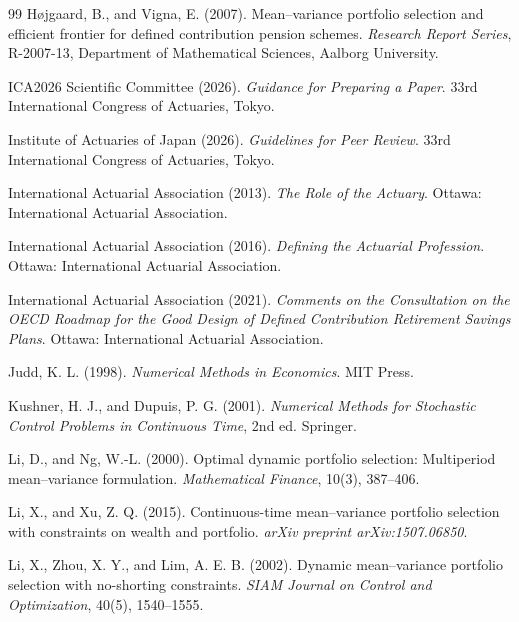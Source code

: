 \documentclass[10pt,a4paper]{article}
\theoremstyle{plain}
\theoremstyle{definition}
\begin{document}
\begin{thebibliography}{99}
H{\o}jgaard, B., and Vigna, E. (2007).
Mean--variance portfolio selection and efficient frontier for defined contribution pension schemes.
\emph{Research Report Series}, R-2007-13, Department of Mathematical Sciences, Aalborg University.

ICA2026 Scientific Committee (2026).
\emph{Guidance for Preparing a Paper}.
33rd International Congress of Actuaries, Tokyo.

Institute of Actuaries of Japan (2026).
\emph{Guidelines for Peer Review}.
33rd International Congress of Actuaries, Tokyo.

International Actuarial Association (2013).
\emph{The Role of the Actuary}.
Ottawa: International Actuarial Association.

International Actuarial Association (2016).
\emph{Defining the Actuarial Profession}.
Ottawa: International Actuarial Association.

International Actuarial Association (2021).
\emph{Comments on the Consultation on the OECD Roadmap for the Good Design of Defined Contribution Retirement Savings Plans}.
Ottawa: International Actuarial Association.

Judd, K. L. (1998).
\emph{Numerical Methods in Economics}.
MIT Press.

Kushner, H. J., and Dupuis, P. G. (2001).
\emph{Numerical Methods for Stochastic Control Problems in Continuous Time}, 2nd ed.
Springer.

Li, D., and Ng, W.-L. (2000).
Optimal dynamic portfolio selection: Multiperiod mean--variance formulation.
\emph{Mathematical Finance}, 10(3), 387--406.

Li, X., and Xu, Z. Q. (2015).
Continuous-time mean--variance portfolio selection with constraints on wealth and portfolio.
\emph{arXiv preprint arXiv:1507.06850}.

Li, X., Zhou, X. Y., and Lim, A. E. B. (2002).
Dynamic mean--variance portfolio selection with no-shorting constraints.
\emph{SIAM Journal on Control and Optimization}, 40(5), 1540--1555.


\end{thebibliography}
\end{document}

